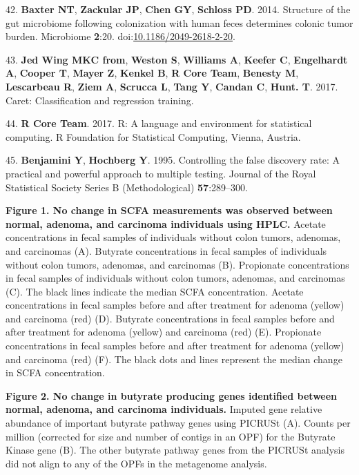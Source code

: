 \documentclass[11pt,]{article}
\begin{document}
\hypertarget{ref-scfa_baxter2014}{}
42. \textbf{Baxter NT}, \textbf{Zackular JP}, \textbf{Chen GY},
\textbf{Schloss PD}. 2014. Structure of the gut microbiome following
colonization with human feces determines colonic tumor burden.
Microbiome \textbf{2}:20.
doi:\href{https://doi.org/10.1186/2049-2618-2-20}{10.1186/2049-2618-2-20}.

\hypertarget{ref-caret_citation}{}
43. \textbf{Jed Wing MKC from}, \textbf{Weston S}, \textbf{Williams A},
\textbf{Keefer C}, \textbf{Engelhardt A}, \textbf{Cooper T},
\textbf{Mayer Z}, \textbf{Kenkel B}, \textbf{R Core Team},
\textbf{Benesty M}, \textbf{Lescarbeau R}, \textbf{Ziem A},
\textbf{Scrucca L}, \textbf{Tang Y}, \textbf{Candan C}, \textbf{Hunt.
T}. 2017. Caret: Classification and regression training.

\hypertarget{ref-r_citation_2017}{}
44. \textbf{R Core Team}. 2017. R: A language and environment for
statistical computing. R Foundation for Statistical Computing, Vienna,
Austria.

\hypertarget{ref-benjamini_controlling_1995}{}
45. \textbf{Benjamini Y}, \textbf{Hochberg Y}. 1995. Controlling the
false discovery rate: A practical and powerful approach to multiple
testing. Journal of the Royal Statistical Society Series B
(Methodological) \textbf{57}:289--300.

\newpage

\textbf{Figure 1. No change in SCFA measurements was observed between
normal, adenoma, and carcinoma individuals using HPLC.} Acetate
concentrations in fecal samples of individuals without colon tumors,
adenomas, and carcinomas (A). Butyrate concentrations in fecal samples
of individuals without colon tumors, adenomas, and carcinomas (B).
Propionate concentrations in fecal samples of individuals without colon
tumors, adenomas, and carcinomas (C). The black lines indicate the
median SCFA concentration. Acetate concentrations in fecal samples
before and after treatment for adenoma (yellow) and carcinoma (red) (D).
Butyrate concentrations in fecal samples before and after treatment for
adenoma (yellow) and carcinoma (red) (E). Propionate concentrations in
fecal samples before and after treatment for adenoma (yellow) and
carcinoma (red) (F). The black dots and lines represent the median
change in SCFA concentration.

\textbf{Figure 2. No change in butyrate producing genes identified
between normal, adenoma, and carcinoma individuals.} Imputed gene
relative abundance of important butyrate pathway genes using PICRUSt
(A). Counts per million (corrected for size and number of contigs in an
OPF) for the Butyrate Kinase gene (B). The other butyrate pathway genes
from the PICRUSt analysis did not align to any of the OPFs in the
metagenome analysis.
\end{document}
